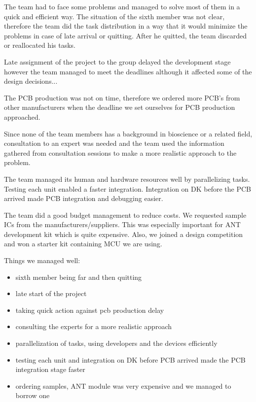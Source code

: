 The team had to face some problems and managed to solve most of them in a quick and efficient way. The situation of the sixth member was not clear, therefore the team did the task distribution in a way that it would minimize the problems in case of late arrival or quitting. After he quitted, the team discarded or reallocated his tasks. 

Late assignment of the project to the group delayed the development stage however the team managed to meet the deadlines although it affected some of the design decisions... 

The PCB production was not on time, therefore we ordered more PCB’s from other manufacturers when the deadline we set ourselves for PCB production approached. 

Since none of the team members has a background in bioscience or a related field, consultation to an expert was needed and the team used the information gathered from consultation sessions to make a more realistic approach to the problem. 

The team managed its human and hardware resources well by parallelizing tasks. Testing each unit enabled a faster integration. Integration on DK before the PCB arrived made PCB integration and debugging easier. 

The team did a good budget management to reduce costs. We requested sample ICs from the manufacturers/suppliers. This was especially important for ANT development kit which is quite expensive. Also, we joined a design competition and won a starter kit containing MCU we are using.

Things we managed well:
\begin{itemize}
\item sixth member being far and then quitting
\item late start of the project
\item taking quick action against pcb production delay
\item consulting the experts for a more realistic approach  
\item parallelization of tasks, using developers and the devices efficiently
\item testing each unit and integration on DK before PCB arrived made the PCB integration stage faster
\item ordering samples, ANT module was very expensive and we managed to borrow one 
\end{itemize}

